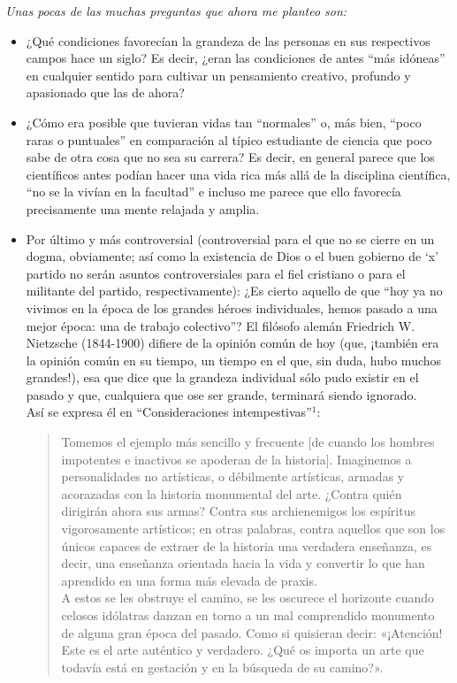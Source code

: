 \documentclass{article}
\begin{document}
\begin{center}
    \emph{\textcolor{Bittersweet}{Unas pocas de las muchas preguntas que ahora me planteo son:}}
\end{center}

\begin{itemize}
    \item ¿Qué condiciones favorecían la grandeza de las personas en sus respectivos campos hace un siglo? Es decir, ¿eran las condiciones de antes ``más idóneas'' en cualquier sentido para cultivar un pensamiento creativo, profundo y apasionado que las de ahora?
    \item ¿Cómo era posible que tuvieran vidas tan ``normales'' o, más bien, ``poco raras o puntuales'' en comparación al típico estudiante de ciencia que poco sabe de otra cosa que no sea su carrera? Es decir, en general parece que los científicos antes podían hacer una vida rica más allá de la disciplina científica, ``no se la vivían en la facultad'' e incluso me parece que ello favorecía precisamente una mente relajada y amplia.
    \item Por último y más controversial (controversial para el que no se cierre en un dogma, obviamente; así como la existencia de Dios o el buen gobierno de `x' partido no serán asuntos controversiales para el fiel cristiano o para el militante del partido, respectivamente): ¿Es cierto aquello de que ``hoy ya no vivimos en la época de los grandes héroes individuales, hemos pasado a una mejor época: una de trabajo colectivo''? El filósofo alemán Friedrich W. Nietzsche (1844-1900) difiere de la opinión común de hoy (que, ¡también era la opinión común en su tiempo, un tiempo en el que, sin duda, hubo muchos grandes!), esa que dice que la grandeza individual sólo pudo existir en el pasado y que, cualquiera que ose ser grande, terminará siendo ignorado.\\
    
    Así se expresa él en ``Consideraciones intempestivas''$^1$: \\
    
    \begin{quote}
        Tomemos el ejemplo más sencillo y frecuente $[$de cuando los hombres impotentes e inactivos se apoderan de la historia$]$. Imaginemos a personalidades no artísticas, o débilmente artísticas, armadas y acorazadas con la historia monumental del arte. ¿Contra quién dirigirán ahora sus armas? Contra sus archienemigos los espíritus vigorosamente artísticos; en otras palabras, contra aquellos que son los únicos capaces de extraer de la historia una verdadera enseñanza, es decir, una enseñanza orientada hacia la vida y convertir lo que han aprendido en una forma más elevada de praxis.\\
        A estos se les obstruye el camino, se les oscurece el horizonte cuando celosos idólatras danzan en torno a un mal comprendido monumento de alguna gran época del pasado. Como si quisieran decir: «¡Atención! Este es el arte auténtico y verdadero. ¿Qué os importa un arte que todavía está en gestación y en la búsqueda de su camino?».
    \end{quote}
    

\end{itemize}
\end{document}
